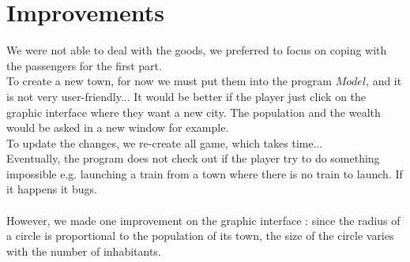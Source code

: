 \documentclass[a4paper]{article}
\begin{document}
	\section{Improvements}
	We were not able to deal with the goods, we preferred to focus on coping with the passengers for the first part.\\
	To create a new town, for now we must put them into the program $Model$, and it is not very user-friendly... It would be better if the player just click on the graphic interface where they want a new city. The population and the wealth would be asked in a new window for example.\\
	To update the changes, we re-create all game, which takes time...\\
	Eventually, the program does not check out if the player try to do something impossible e.g. launching a train from a town where there is no train to launch. If it happens it bugs.  \\
	  \\
	 However, we made one improvement on the graphic interface : since the radius of a circle is proportional to the population of its town, the size of the circle varies with the number of inhabitants.
	
\end{document}

